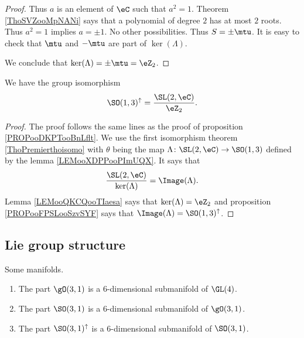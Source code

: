 \begin{proof}
    Thus \( a\) is an element of \( \eC\) such that \( a^2=1\). Theorem \ref{ThoSVZooMpNANi} says that a polynomial of degree \( 2\) has at most \( 2\) roots. Thus \( a^2=1\) implies \( a=\pm 1\). No other possibilities. Thus \( S=\pm\mtu\). It is easy to check that \( \mtu\) and \( -\mtu\) are part of \( \ker(\Lambda)\).

    We conclude that \( \ker(\Lambda)=\pm\mtu=\eZ_2\).
\end{proof}

\begin{theorem}
    We have the group isomorphism
    \begin{equation}
        \SO(1,3)^{\uparrow}=\frac{ \SL(2,\eC) }{ \eZ_2 }.
    \end{equation}
\end{theorem}

\begin{proof}
    The proof follows the same lines as the proof of proposition \ref{PROPooDKPTooBnLflt}. We use the first isomorphism theorem \ref{ThoPremierthoisomo} with \( \theta\) being the map \( \Lambda\colon \SL(2,\eC)\to \SO(1,3)\) defined by the lemma \ref{LEMooXDPPooPImUQX}. It says that
    \begin{equation}
        \frac{ \SL(2,\eC) }{ \ker(\Lambda) }=\Image(\Lambda).
    \end{equation}
    Lemma \ref{LEMooQKCQooTIaesa} says that \( \ker(\Lambda)=\eZ_2\) and proposition \ref{PROPooFPSLooSzvSYF} says that \( \Image(\Lambda)=\SO(1,3)^{\uparrow}\).
\end{proof}

\subsection{Lie group structure}

\begin{lemma}       \label{LEMooISDKooUnafZR}
    Some manifolds.
    \begin{enumerate}
        \item
            The part \( \gO(3,1)\) is a \( 6\)-dimensional submanifold of \( \GL(4)\).
        \item
            The part \( \SO(3,1)\) is a \( 6\)-dimensional submanifold of \( \gO(3,1)\).
        \item
            The part \( \SO(3,1)^{\uparrow}\) is a \( 6\)-dimensional submanifold of \( \SO(3,1)\).
    \end{enumerate}
\end{lemma}


